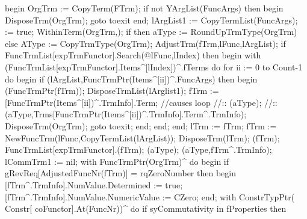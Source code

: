          begin
            OrgTrm := CopyTerm(FTrm);
            if not YArgList(FuncArgs) then
            begin DisposeTrm(OrgTrm);
            goto toexit
            end;
            lArgList1 := CopyTermList(FuncArgs);
             := true;
            WithinTerm(OrgTrm,);
            if  then aType := RoundUpTrmType(OrgTrm)
            else AType := CopyTrmType(OrgTrm);
            AdjustTrm(fTrm,lFunc,lArgList);
            if FuncTrmList[expTrmFunctor].Search(@lFunc,lIndex) then
            begin
               with (FuncTrmList[expTrmFunctor].Items^[lIndex])^.fTerms do
                  for ii := 0 to Count-1 do
                  begin
                     if (lArgList,FuncTrmPtr(Items^[ii])^.FuncArgs) then
                     begin
                        (FuncTrmPtr(fTrm));
                        DisposeTrmList(lArglist1);
                        fTrm := [FuncTrmPtr(Items^[ii])^.TrmInfo].Term;
                        //causes loop
                        //::            (aType);
                        //::            (aType,Trms[FuncTrmPtr(Items^[ii])^.TrmInfo].Term^.TrmInfo);
                        DisposeTrm(OrgTrm);
                        goto toexit;
                     end;
                  end;
            end;
            lTrm := fTrm;
            fTrm := NewFuncTrm(lFunc,CopyTermList(lArgList));
            DisposeTrm(lTrm);
            (fTrm);
            FuncTrmList[expTrmFunctor].(fTrm);
            (aType);
            (aType,fTrm^.TrmInfo);
            lCommTrm1 := nil;
            with FuncTrmPtr(OrgTrm)^ do
            begin
               if gRevReq[AdjustedFuncNr(fTrm)] = rqZeroNumber then
               begin
                  [fTrm^.TrmInfo].NumValue.Determined := true;
                  [fTrm^.TrmInfo].NumValue.NumericValue := CZero;
               end;
               with ConstrTypPtr( Constr[ coFunctor].At(FuncNr))^ do
                  if syCommutativity in fProperties then

